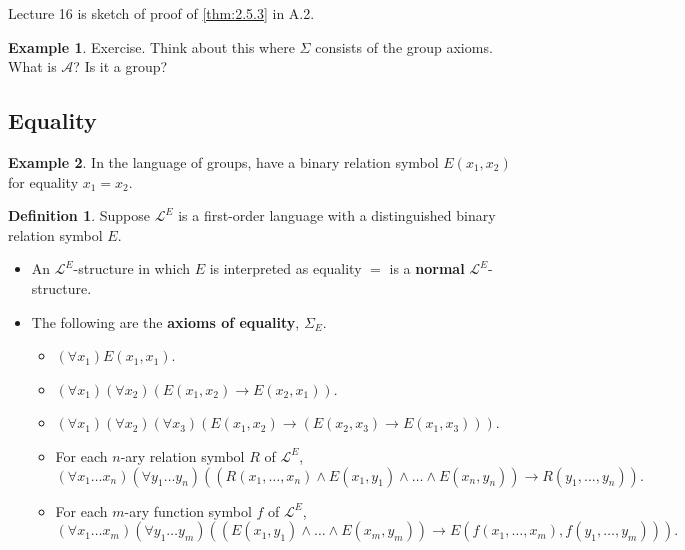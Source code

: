 \documentclass{article}
\newcommand{\A}{\mathcal{A}}
\renewcommand{\L}{\mathcal{L}}
\newcommand{\rb}[1]{\left( #1 \right)}
\newcommand{\impb}[2]{\rb{#1 \rightarrow #2}}
\newcommand{\fab}[1]{\rb{\forall #1}}
\theoremstyle{definition}\newtheorem{definition}{Definition}[subsection]
\theoremstyle{definition}\newtheorem{remark1}[definition]{Remark}
\theoremstyle{definition}\newtheorem{example1}[definition]{Example}
\theoremstyle{definition}\newtheorem*{remark2}{Remark}
\theoremstyle{definition}\newtheorem*{example2}{Example}
\theoremstyle{definition}\newtheorem*{note}{Note}
\theoremstyle{definition}\newtheorem*{notation}{Notation}
\begin{document}
Lecture 16 is sketch of proof of \ref{thm:2.5.3} in A.2.

\begin{example2}
Exercise. Think about this where $ \Sigma $ consists of the group axioms. What is $ \A $? Is it a group?
\end{example2}


\subsection{Equality}

\begin{example2}
In the language of groups, have a binary relation symbol $ E\rb{x_1, x_2} $ for equality $ x_1 = x_2 $.
\end{example2}

\begin{definition}
Suppose $ \L^E $ is a first-order language with a distinguished binary relation symbol $ E $.
\begin{itemize}
\item An $ \L^E $-structure in which $ E $ is interpreted as equality $ = $ is a \textbf{normal} $ \L^E $-structure.
\item The following are the \textbf{axioms of equality}, $ \Sigma_E $.
\begin{itemize}
\item $ \fab{x_1}E\rb{x_1, x_1} $.
\item $ \fab{x_1}\fab{x_2}\impb{E\rb{x_1, x_2}}{E\rb{x_2, x_1}} $.
\item $ \fab{x_1}\fab{x_2}\fab{x_3}\impb{E\rb{x_1, x_2}}{\impb{E\rb{x_2, x_3}}{E\rb{x_1, x_3}}} $.
\item For each $ n $-ary relation symbol $ R $ of $ \L^E $,
$$ \fab{x_1 \dots x_n}\fab{y_1 \dots y_n}\impb{\rb{R\rb{x_1, \dots, x_n} \land E\rb{x_1, y_1} \land \dots \land E\rb{x_n, y_n}}}{R\rb{y_1, \dots, y_n}}. $$
\item For each $ m $-ary function symbol $ f $ of $ \L^E $,
$$ \fab{x_1 \dots x_m}\fab{y_1 \dots y_m}\impb{\rb{E\rb{x_1, y_1} \land \dots \land E\rb{x_m, y_m}}}{E\rb{f\rb{x_1, \dots, x_m}, f\rb{y_1, \dots, y_m}}}. $$
\end{itemize}
\end{itemize}
\end{definition}

\pagebreak
\end{document}
